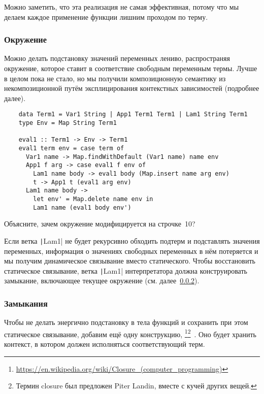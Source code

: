 Можно заметить, что эта реализация не самая эффективная, потому что мы делаем каждое применение функции лишним проходом по терму.

\subsubsection{Окружение}

Можно делать подстановку значений переменных лениво, распространяя окружение, которое ставит в соответствие свободным переменным термы.
Лучше в целом пока не стало, но мы получили композиционную семантику из некомпозиционной путём эксплицирования контекстных зависимостей (подробнее далее). %

\begin{verbatim}
    data Term1 = Var1 String | App1 Term1 Term1 | Lam1 String Term1
    type Env = Map String Term1

    eval1 :: Term1 -> Env -> Term1
    eval1 term env = case term of
      Var1 name -> Map.findWithDefault (Var1 name) name env
      App1 f arg -> case eval1 f env of
        Lam1 name body -> eval1 body (Map.insert name arg env)
        t -> App1 t (eval1 arg env)
      Lam1 name body ->
        let env' = Map.delete name env in
        Lam1 name (eval1 body env')
\end{verbatim}

\begin{task}
    Объясните, зачем окружение модифицируется на строчке~10?
\end{task}

Если ветка \texttt|Lam1| не будет рекурсивно обходить подтерм и подставлять значения переменных, информация о значениях свободных переменных в нём потеряется и мы получим динамическое связывание вместо статического.
Чтобы восстановить статическое связывание, ветка \texttt|Lam1| интерпретатора должна конструировать замыкание, включающее текущее окружение (см. далее~\ref{subsubsec:closures}).

\subsubsection{Замыкания} \label{subsubsec:closures}

Чтобы не делать энергично подстановку в тела функций и сохранить при этом статическое связывание, добавим ещё одну конструкцию, \footnote{\url{https://en.wikipedia.org/wiki/Closure_(computer_programming)}}\footnote{Термин closure был предложен Piter Landin, вместе с кучей других вещей.}~\cite[глава 11]{nystrom2021crafting}.
Оно будет хранить контекст, в котором должен исполняться соответствующий терм.

